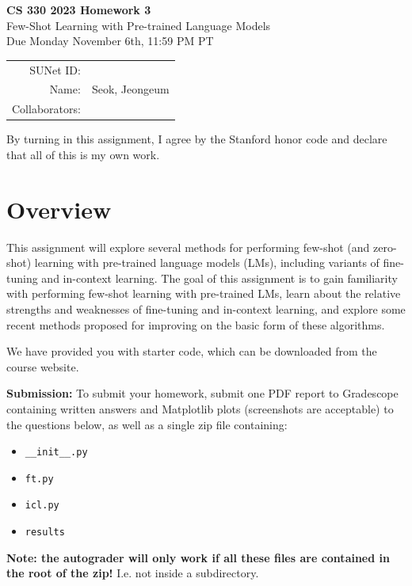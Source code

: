 \documentclass[12pt]{article}
\begin{document}
    \begin{center}
    {\Large \textbf{CS 330 2023 Homework 3} \\ Few-Shot Learning with Pre-trained Language Models
    \\
    \vspace{0.2cm}
    Due Monday November 6th, 11:59 PM PT}

        \begin{tabular}{rl}
            SUNet ID:      &                \\
            Name:          & Seok, Jeongeum \\
            Collaborators: &
        \end{tabular}
    \end{center}

    By turning in this assignment, I agree by the Stanford honor code and declare that all of this is my own work.

    \section*{Overview}
    This assignment will explore several methods for performing few-shot (and zero-shot) learning with pre-trained language models (LMs), including variants of fine-tuning and in-context learning. The goal of this assignment is to gain familiarity with performing few-shot learning with pre-trained LMs, learn about the relative strengths and weaknesses of fine-tuning and in-context learning, and explore some recent methods proposed for improving on the basic form of these algorithms.

    \noindent We have provided you with starter code, which can be downloaded from the course website.

    \textbf{Submission:} To submit your homework, submit one PDF report to Gradescope containing written answers and Matplotlib plots (screenshots are acceptable) to the questions below, as well as a single zip file containing:
    \begin{itemize}
        \item \texttt{\_\_init\_\_.py}
        \item \texttt{ft.py}
        \item \texttt{icl.py}
        \item \texttt{results}
    \end{itemize}
    \textbf{Note: the autograder will only work if all these files are contained in the root of the zip!} I.e. not inside a subdirectory.
\end{document}
